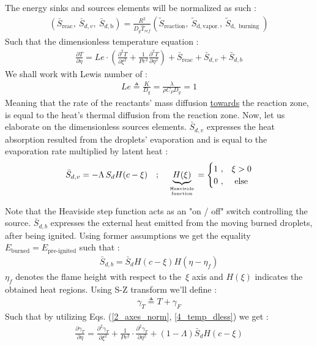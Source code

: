 \documentclass[12pt]{article}
\numberwithin{equation}{section}
\begin{document}
\begin{flushleft}
The energy sinks and sources elements will be normalized as such :
\begin{align}
\left(\bar{S}_{\mathrm{reac}}, \ \bar{S}_{d, v}, \ \bar{S}_{d, \mathrm{b}}\right)=\frac{R^{2}}{D_{g} \hat{T}_{ref}}\left(\tilde{S}_{\mathrm{reaction}}, \ \tilde{S}_{\mathrm{d}, \mathrm{vapor} .}, \ \tilde{S}_{\mathrm{d}, \text{ burning }}\right) \label{4_energy}
\end{align}
Such that the dimensionless temperature equation :
\begin{align}
\frac{\partial T}{\partial \eta}=L e \cdot\left(\frac{\partial^{2} T}{\partial \xi^{2}}+\frac{1}{P e^{2}} \frac{\partial^{2} T}{\partial \eta^{2}}\right)+\bar{S}_{\text{reac}}+\bar{S}_{d, v}+\bar{S}_{d, b} \label{4_temp_dless}
\end{align}
We shall work with Lewis number of :
\begin{align}
L e \triangleq \frac{K}{D_{g}}=\frac{\lambda}{\rho C_{P} D_{g}}=1
\end{align}
Meaning that the rate of the reactants' mass diffusion \underline{towards} the reaction zone, is equal to the heat's thermal diffusion from the reaction zone. Now, let us elaborate on the dimensionless sources elements. $\bar{S}_{d, v}$ expresses the heat absorption resulted from the droplets' evaporation and is equal to the evaporation rate multiplied by latent heat :
\begin{align}
\bar{S}_{d, v}=-\Lambda \, S_{d} H(c-\xi) \quad ; \quad \underbrace{H(\xi)}_{\text {Heaviside} \atop \text { function }} = \begin{cases}
1\ , & \xi>0 \\
0\ , & \text { else }
\end{cases}
\end{align}

Note that the Heaviside step function acts as an "on / off" switch controlling the source. $\bar{S}_{d, b}$ expresses the external heat emitted from the moving burned droplets, after being ignited. Using former assumptions we get the equality $E_{\text {burned}}=E_{\text {pre-ignited}}$ such that :
\begin{align}
\bar{S}_{d, b}=\bar{S}_{d} H(c-\xi) H\left(\eta-\eta_{f}\right)
\end{align}
$\eta_{f}$ denotes the flame height with respect to the \,$\xi$ axis and $H(\xi)$ indicates the obtained heat regions. Using S-Z transform we'll define :
\begin{align}
\gamma_{T} \triangleq T+\gamma_{F} \label{4_gamma_T}
\end{align}
Such that by utilizing Eqs. (\ref{2_axes_norm}, \ref{4_temp_dless}) we get :
\begin{align}
\frac{\partial \gamma_{T}}{\partial \eta}=\frac{\partial^{2} \gamma_{T}}{\partial \xi^{2}}+\frac{1}{P e^{2}} \cdot \frac{\partial^{2} \gamma_{T}}{\partial \eta^{2}}+(1-\Lambda) \bar{S}_{d} H(c-\xi) 
\end{align}


\end{flushleft}
\end{document}
